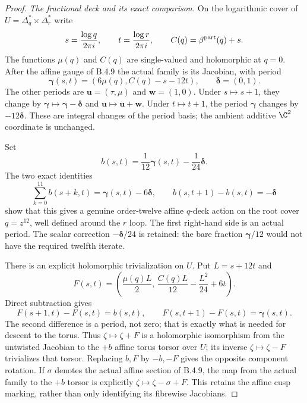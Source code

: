 \begin{proof}
\emph{The fractional deck and its exact comparison.}
On the logarithmic cover of
$U=\Delta_q^*\times\Delta_r^*$ write
\[
 s=\frac{\log q}{2\pi i},\qquad
 t=\frac{\log r}{2\pi i},\qquad
 C(q)=\beta^{\rm part}(q)+s.
\]
The functions $\mu(q)$ and $C(q)$ are single-valued
and holomorphic at $q=0$. After the affine gauge of
B.4.9 the actual family is its Jacobian, with period
\[
 \boldsymbol\gamma(s,t)
       =(6\mu(q),C(q)-s-12t),\qquad
 \boldsymbol\delta=(0,1).
 \tag{B.4.18.1}
\]
The other periods are
$\mathbf u=(\tau,\mu)$ and $\mathbf w=(1,0)$.
Under $s\mapsto s+1$, they change by
$\boldsymbol\gamma\mapsto\boldsymbol\gamma-
\boldsymbol\delta$ and $\mathbf u\mapsto\mathbf u+\mathbf w$.
Under $t\mapsto t+1$, the period $\boldsymbol\gamma$
changes by $-12\boldsymbol\delta$.
These are integral changes of the period basis; the
ambient additive $\C^2$ coordinate is unchanged.

Set
\[
 b(s,t)=\frac1{12}\boldsymbol\gamma(s,t)
                         -\frac1{24}\boldsymbol\delta.
\]
The two exact identities
\[
 \sum_{k=0}^{11}b(s+k,t)
       =\boldsymbol\gamma(s,t)-6\boldsymbol\delta,
 \qquad
 b(s,t+1)-b(s,t)=-\boldsymbol\delta
 \tag{B.4.18.2}
\]
show that this gives a genuine order-twelve affine
$q$-deck action on the root cover $q=z^{12}$,
well defined around the $r$ loop. The first right-hand
side is an actual period. The scalar correction
$-\boldsymbol\delta/24$ is retained: the bare fraction
$\boldsymbol\gamma/12$ would not have the required
twelfth iterate.

There is an explicit holomorphic trivialization on $U$.
Put $L=s+12t$ and
\[
 F(s,t)=
 \left(\frac{\mu(q)L}{2},\,
       \frac{C(q)L}{12}-\frac{L^2}{24}+6t\right).
 \tag{B.4.18.3}
\]
Direct subtraction gives
\[
 F(s+1,t)-F(s,t)=b(s,t),\qquad
 F(s,t+1)-F(s,t)=\boldsymbol\gamma(s,t).
 \tag{B.4.18.4}
\]
The second difference is a period, not zero; that is
exactly what is needed for descent to the torus.
Thus $\zeta\mapsto\zeta+F$ is a holomorphic
isomorphism from the untwisted Jacobian to the
$+b$ affine torus torsor over $U$; its inverse
$\zeta\mapsto\zeta-F$ trivializes that torsor.
Replacing $b,F$ by $-b,-F$ gives the opposite
component rotation. If $\sigma$ denotes the actual
affine section of B.4.9, the map from the actual
family to the $+b$ torsor is explicitly
$\zeta\mapsto\zeta-\sigma+F$.
This retains the affine cusp marking, rather
than only identifying its fibrewise Jacobians.


\end{proof}

